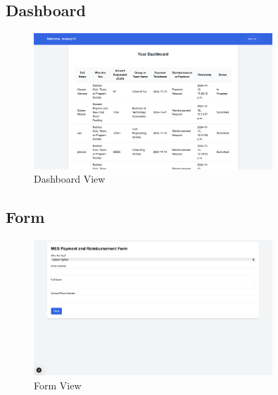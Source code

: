 \documentclass[12pt, titlepage]{article}
\begin{document}
\subsection{Dashboard}
\begin{figure}[H]
    \centering
    \includegraphics[width=0.8\textwidth]{img/dashboard.png}
    \caption{Dashboard View}
    \label{fig:dashboard}
\end{figure}

\subsection{Form}
\begin{figure}[H]
    \centering
    \includegraphics[width=0.8\textwidth]{img/form.png}
    \caption{Form View}
    \label{fig:form}
\end{figure}
\end{document}
